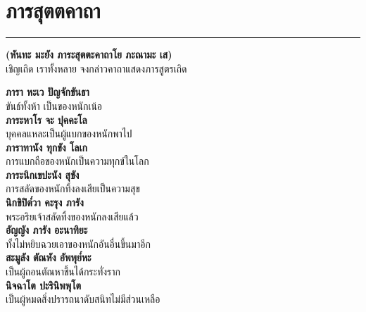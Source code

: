 \documentclass[12pt]{article}
\begin{document}
\pagebreak
\section{ภารสุตตคาถา}
\hrule
\begin{center}
\textbf{(หันทะ มะยัง ภาระสุตตะคาถาโย ภะณามะ เส)}\\
เชิญเถิด เราทั้งหลาย จงกล่าวคาถาแสดงภารสูตรเถิด
\end{center}
\textbf{ภารา หะเว ปัญจักขันธา }\\
\indent ขันธ์ทั้งห้า เป็นของหนักเน้อ\\
\textbf{ภาระหาโร จะ ปุคคะโล }\\
\indent บุคคลแหละเป็นผู้แบกของหนักพาไป\\
\textbf{ภาราทานัง ทุกขัง โลเก }\\
\indent การแบกถือของหนักเป็นความทุกข์ในโลก\\
\textbf{ภาระนิกเขปะนัง สุขัง }\\
\indent การสลัดของหนักทิ้งลงเสียเป็นความสุข\\
\textbf{นิกขิปิต๎วา คะรุง ภารัง }\\
\indent พระอริยเจ้าสลัดทิ้งของหนักลงเสียแล้ว\\
\textbf{อัญญัง ภารัง อะนาทิยะ }\\
\indent ทั้งไม่หยิบฉวยเอาของหนักอันอื่นขึ้นมาอีก\\
\textbf{สะมูลัง ตัณหัง อัพพุย๎หะ }\\
\indent เป็นผู้ถอนตัณหาขึ้นได้กระทั่งราก\\
\textbf{นิจฉาโต ปะรินิพพุโต }\\
\indent เป็นผู้หมดสิ่งปรารถนาดับสนิทไม่มีส่วนเหลือ

\pagebreak
\end{document}
